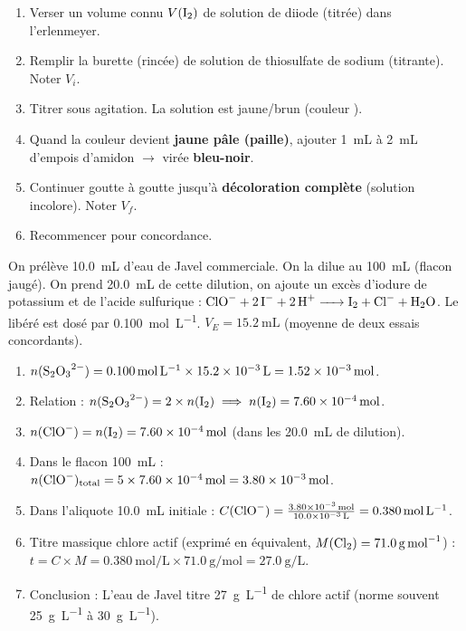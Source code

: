 \documentclass[11pt]{article}
\begin{document}
\begin{methode}
\begin{enumerate}
  \item Verser un volume connu $V(\ce{I2})$ de solution de diiode (titrée) dans l'erlenmeyer.
  \item Remplir la burette (rincée) de solution de thiosulfate de sodium  (titrante). Noter $V_i$.
  \item Titrer sous agitation. La solution est jaune/brun (couleur ).
  \item Quand la couleur devient \textbf{jaune pâle (paille)}, ajouter \SI{1}{\milli\liter} à \SI{2}{\milli\liter} d'empois d'amidon $\to$ virée \textbf{bleu-noir}.
  \item Continuer goutte à goutte jusqu'à \textbf{décoloration complète} (solution incolore). Noter $V_f$.
  \item Recommencer pour concordance.
\end{enumerate}
\end{methode}

\begin{exemplebox}
On prélève \SI{10,0}{\milli\liter} d'eau de Javel commerciale. On la dilue au \SI{100}{\milli\liter} (flacon jaugé). On prend \SI{20,0}{\milli\liter} de cette dilution, on ajoute un excès d'iodure de potassium  et de l'acide sulfurique : $\ce{ClO- + 2I- + 2H+ -> I2 + Cl- + H2O}$. Le  libéré est dosé par  \SI{0,100}{\mole\per\liter}.
$V_E = \SI{15,2}{\milli\liter}$ (moyenne de deux essais concordants).
\begin{enumerate}
  \item $n(\ce{S2O3^{2-}}) = \SI{0,100}{\mole\per\liter} \times \SI{15,2e-3}{\liter} = \SI{1,52e-3}{\mole}$.
  \item Relation : $n(\ce{S2O3^{2-}}) = 2 \times n(\ce{I2}) \implies n(\ce{I2}) = \SI{7,60e-4}{\mole}$.
  \item $n(\ce{ClO-}) = n(\ce{I2}) = \SI{7,60e-4}{\mole}$ (dans les \SI{20,0}{\milli\liter} de dilution).
  \item Dans le flacon \SI{100}{\milli\liter} : $n(\ce{ClO-})_{\text{total}} = 5 \times \SI{7,60e-4}{\mole} = \SI{3,80e-3}{\mole}$.
  \item Dans l'aliquote \SI{10,0}{\milli\liter} initiale : $C(\ce{ClO-}) = \frac{\SI{3,80e-3}{\mole}}{\SI{10,0e-3}{\liter}} = \SI{0,380}{\mole\per\liter}$.
  \item Titre massique chlore actif (exprimé en  équivalent, $M(\ce{Cl2}) = \SI{71,0}{\gram\per\mol}$) :
  $t = C \times M = \SI{0,380}{\mole\per\liter} \times \SI{71,0}{\gram\per\mol} = \SI{27,0}{\gram\per\liter}$.
  \item Conclusion : L'eau de Javel titre \SI{27}{\gram\per\liter} de chlore actif (norme souvent \SI{25}{\gram\per\liter} à \SI{30}{\gram\per\liter}).
\end{enumerate}
\end{exemplebox}
\end{document}
